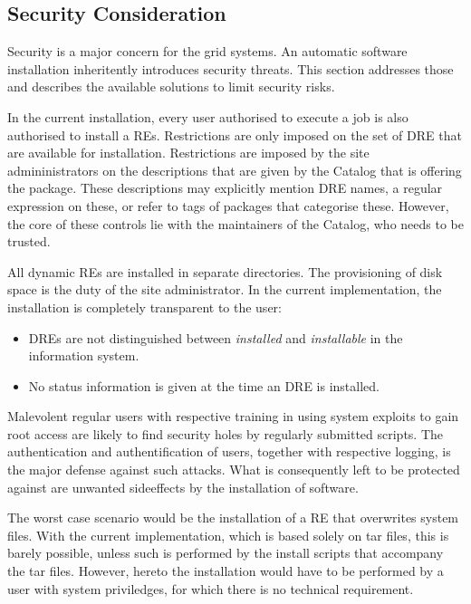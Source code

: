 \subsection{Security Consideration}



Security is a major concern for the grid systems. An automatic software
installation inheritently introduces security threats. This section
addresses those and describes the available solutions to limit
security risks.

In the current installation, every user authorised to execute a job is
also authorised to install a REs. Restrictions are
only imposed on the set of DRE that are available for installation.
Restrictions are imposed by the site admininistrators on the descriptions
that are given by the Catalog that is offering the package. These
descriptions may explicitly mention DRE names, a regular expression on
these, or refer to tags of packages that categorise these. However,
the core of these controls lie with the maintainers of the Catalog,
who needs to be trusted.

All dynamic REs are installed in separate directories. The provisioning of
disk space is the duty of the site administrator.  In the current
implementation, the installation is completely transparent to the user:

\begin{itemize}
\item DREs are not distinguished between {\em installed} and
  {\em installable} in the information system.
\item No status information is given at the time an DRE is installed.
\end{itemize}

Malevolent regular users with respective training in using system exploits
to gain root access are likely to find security holes by regularly
submitted scripts.  The authentication and authentification of users,
together with respective logging, is the major defense against such
attacks. What is consequently left to be protected against are unwanted
sideeffects by the installation of software.

The worst case scenario would be the installation of a RE
that overwrites system files. With the current implementation, which is
based solely on tar files, this is barely possible, unless such is
performed by the install scripts that accompany the tar files. However,
hereto the installation would have to be performed by a user with system
priviledges, for which there is no technical requirement.

